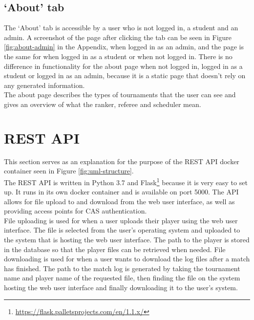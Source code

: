 \documentclass[a4paper, 12pt]{report}
\begin{document}
\subsection{`About' tab}
\label{sec:impl-tab-about}

The `About' tab is accessible by a user who is not logged in, a student
and an admin. A screenshot of the page after clicking the tab can be seen in
Figure \ref{fig:about-admin} in the Appendix, when logged in as an admin,
and the page is the same for when logged in as a student or when not logged in.
There is no difference in functionality for the about page when not logged in,
logged in as a student or logged in as an admin, because it is a static page
that doesn't rely on any generated information. \\

The about page describes the types of tournaments that the user can see and
gives an overview of what the ranker, referee and scheduler mean.

\section{REST API}

This section serves as an explanation for the purpose of the REST API docker
container seen in Figure \ref{fig:uml-structure}. \\

The REST API is written in Python 3.7 and Flask\footnote{\url{https://flask.palletsprojects.com/en/1.1.x/}}
because it is very easy to set up. It runs in its own docker container and is
available on port 5000. The API allows for file upload to and download from the
web user interface, as well as providing access points for CAS authentication. \\

File uploading is used for when a user uploads their player using the web user
interface. The file is selected from the user's operating system and uploaded
to the system that is hosting the web user interface. The path to the player
is stored in the database so that the player files can be retrieved when needed.
File downloading is used for when a user wants to download the log files after
a match has finished. The path to the match log is generated by taking the
tournament name and player name of the requested file, then finding the file on
the system hosting the web user interface and finally downloading it to the user's
system. \\
\end{document}
